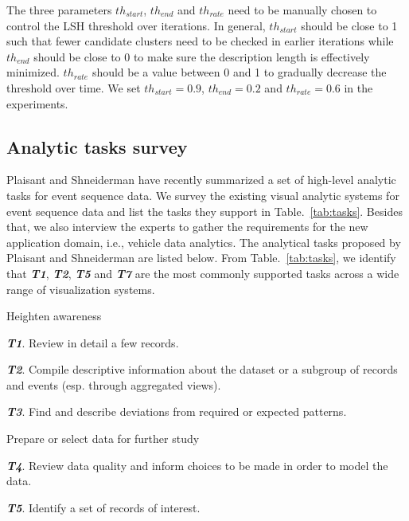 The three parameters $th_{start}$, $th_{end}$ and $th_{rate}$ need to be manually chosen to control the LSH threshold over iterations. In general, $th_{start}$ should be close to 1 such that fewer candidate clusters need to be checked in earlier iterations while $th_{end}$ should be close to 0 to make sure the description length is effectively minimized. $th_{rate}$ should be a value between 0 and 1 to gradually decrease the threshold over time. We set $th_{start} = 0.9$, $th_{end} = 0.2$ and $th_{rate} = 0.6$ in the experiments.

\clearpage
\subsection{Analytic tasks survey}

Plaisant and Shneiderman \cite{plaisant2016tasks} have recently summarized a set of high-level analytic tasks for event sequence data. We survey the existing visual analytic systems for event sequence data and list the tasks they support in Table.~\ref{tab:tasks}. Besides that, we also interview the experts to gather the requirements for the new application domain, i.e., vehicle data analytics. The analytical tasks proposed by Plaisant and Shneiderman are listed below. From Table.~\ref{tab:tasks}, we identify that \textbf{\textit{T1}}, \textbf{\textit{T2}}, \textbf{\textit{T5}} and \textbf{\textit{T7}} are the most commonly supported tasks across a wide range of visualization systems.

Heighten awareness

\begin{compactitem}
	\item \textbf{\textit{T1}}. Review in detail a few records.
	\item \textbf{\textit{T2}}. Compile descriptive information about the dataset or a subgroup of records and events (esp. through aggregated views).
	\item \textbf{\textit{T3}}. Find and describe deviations from required or expected patterns.
\end{compactitem}

Prepare or select data for further study

\begin{compactitem}
	\item \textbf{\textit{T4}}. Review data quality and inform choices to be made in order to model the data.
	\item \textbf{\textit{T5}}. Identify a set of records of interest.
\end{compactitem}

